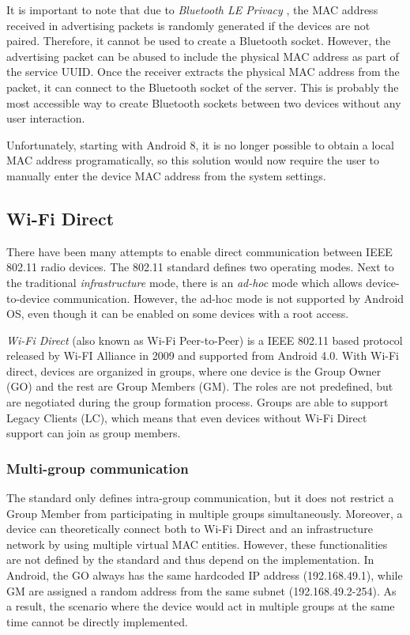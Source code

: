 \documentclass[conference,compsoc]{IEEEtran}
\begin{document}
It is important to note that due to \textit{Bluetooth LE Privacy} \cite{ble:privacy}, the MAC address received in advertising packets is randomly generated if the devices are not paired. Therefore, it cannot be used to create a Bluetooth socket. However, the advertising packet can be abused to include the physical MAC address as part of the service UUID. Once the receiver extracts the physical MAC address from the packet, it can connect to the Bluetooth socket of the server. This is probably the most accessible way to create Bluetooth sockets between two devices without any user interaction. \cite{btautoconnect}

Unfortunately, starting with Android 8, it is no longer possible to obtain a local MAC address programatically, so this solution would now require the user to manually enter the device MAC address from the system settings.

\subsection{Wi-Fi Direct}

There have been many attempts to enable direct communication between IEEE 802.11 radio devices. The 802.11 standard defines two operating modes. Next to the traditional \textit{infrastructure} mode, there is an \textit{ad-hoc} mode which allows device-to-device communication. However, the ad-hoc mode is not supported by Android OS, even though it can be enabled on some devices with a root access.

\textit{Wi-Fi Direct} (also known as Wi-Fi Peer-to-Peer) \cite{wifip2p} is a IEEE 802.11 based protocol released by Wi-FI Alliance in 2009 and supported from Android 4.0. With Wi-Fi direct, devices are organized in groups, where one device is the Group Owner (GO) and the rest are Group Members (GM). The roles are not predefined, but are negotiated during the group formation process. Groups are able to support Legacy Clients (LC), which means that even devices without Wi-Fi Direct support can join as group members.

\subsubsection{Multi-group communication}

The standard only defines intra-group communication, but it does not restrict a Group Member from participating in multiple groups simultaneously. Moreover, a device can theoretically connect both to Wi-Fi Direct and an infrastructure network by using multiple virtual MAC entities. However, these functionalities are not defined by the standard and thus depend on the implementation.
In Android, the GO always has the same hardcoded IP address (192.168.49.1), while GM are assigned a random address from the same subnet (192.168.49.2-254). As a result, the scenario where the device would act in multiple groups at the same time cannot be directly implemented.
\end{document}
